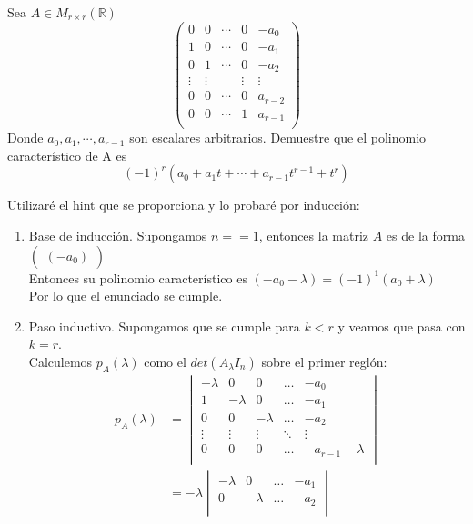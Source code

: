 \documentclass[letter]{memoir} %
\newenvironment{cframed}[1][blue]
  {\begin{tcolorbox}[colframe=#1,colback=white]}
  {\end{tcolorbox}}
\begin{document}
\begin{enumerate}
\begin{cframed}[violet]
\item Sea $A \in M_{r\times r}(\mathbb{R})$
\[
\begin{pmatrix}
0&0&\cdots&0 &-a_0\\
1&0&\cdots&0 &-a_1\\
0&1&\cdots&0 &-a_2\\
\vdots&\vdots&&\vdots&\vdots\\
0&0&\cdots&0 &a_{r-2}\\
0&0&\cdots&1 &a_{r-1}\\
\end{pmatrix}
\]
Donde $a_0, a_1, \cdots, a_{r-1}$ son escalares arbitrarios. Demuestre que el polinomio característico de A es 
\[(-1)^{r}(a_0 + a_1t +\cdots + a_{r-1}t^{r-1} + t^{r})\]
\end{cframed}
Utilizaré el hint que se proporciona y lo probaré por inducción:
\begin{enumerate}
\item Base de inducción. Supongamos $n == 1$, entonces la matriz $A$ es de la forma $\begin{pmatrix}
					(-a_0) 
					\end{pmatrix}$ \\
Entonces su polinomio característico es $(-a_0 - \lambda ) = (-1)^1 (a_0 + \lambda )$\\
Por lo que el enunciado se cumple.
\item Paso inductivo. Supongamos que se cumple para $k<r$ y veamos que pasa con $k = r$.\\
Calculemos $p_A(\lambda)$ como el $det(A_\lambda I_n)$ sobre el primer reglón:\\
\[
\begin{split}
p_A(\lambda) &= \begin{vmatrix}
				-\lambda  & 0 & 0 & \dots & -a_0 \\
                1 & -\lambda & 0 & \dots & -a_1 \\
                0 & 0 & -\lambda & \dots & -a_2\\
                \vdots & \vdots & \vdots & \ddots & \vdots \\
                0 & 0 & 0 & \dots & -a_{r-1} -\lambda\\
				\end{vmatrix} \\
              &= -\lambda \begin{vmatrix}
				 -\lambda & 0 & \dots & -a_1 \\
                 0 & -\lambda & \dots & -a_2\\

\end{vmatrix}
\end{split}\]
\end{enumerate}
\end{enumerate}
\end{document}

